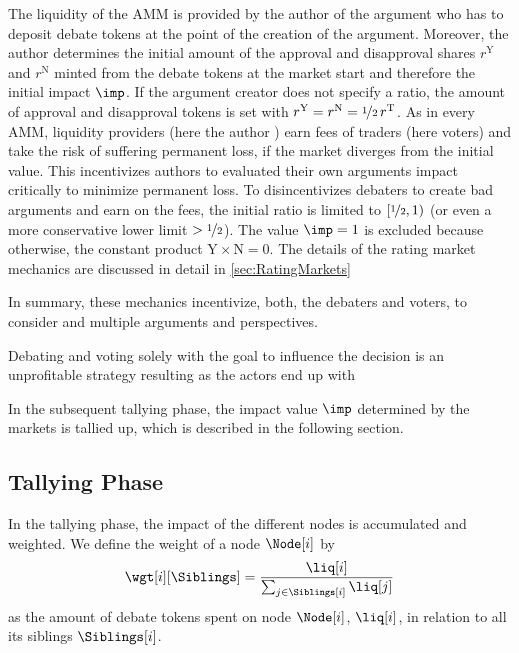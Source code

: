 \documentclass[%
aip,
amsmath,amssymb,
reprint,%
unsortedaddress,
nofootinbib
]{revtex4-2}
\newcommand{\sib}{\text{siblings}}
\newcommand{\T}{\text{T}}
\newcommand{\Y}{\text{Y}}
\newcommand{\N}{\text{N}}
\begin{document}
The liquidity of the \ac{AMM} is provided by the author of the argument who has to deposit debate tokens at the point of the creation of the argument.
Moreover, the author determines the initial amount of the approval and disapproval shares $r^\Y$ and $r^\N$ minted from the debate tokens at the market start
and therefore the initial impact $\imp$.
If the argument creator does not specify a ratio, 
the amount of approval and disapproval tokens is set with $r^\Y=r^\N=\nicefrac{1}{2}\,r^\T$. 
As in every \ac{AMM}, liquidity providers (here the author )
earn fees of traders (here voters)
and 
take the risk of suffering permanent loss, if the market diverges from the initial value.
This incentivizes authors to evaluated their own arguments impact critically 
to minimize permanent loss. 
To disincentivizes debaters to create bad arguments and earn on the fees,
the initial ratio is limited to $[\nicefrac{1}{2},1)$ (or even a more conservative lower limit $>\nicefrac{1}{2}$).
The value $\imp=1$ is excluded because otherwise, the constant product $\Y\times \N = 0$.
The details of the rating market mechanics are discussed in detail in \cref{sec:RatingMarkets}

In summary, these mechanics incentivize, both, the debaters and voters, to consider and multiple arguments and perspectives.
 
Debating and voting solely with the goal to influence the decision is an unprofitable  strategy resulting
as the actors end up with 

In the subsequent tallying phase,
the impact value $\imp$ determined by the markets is tallied up,
which is described in the following section.


\subsection{Tallying Phase}\label{sec:TallyingPhase}
In the tallying phase, the impact of the different nodes is accumulated and weighted.
We define the weight of a node $\Node[i]$ by
\begin{equation}
	\wgt[i][\Siblings] = \frac{\liq[i]}{\sum_{j\in \Siblings[i]}\liq[j]}
\end{equation}
as the 
amount of debate tokens spent on node $\Node[i]$, $\liq[i]$,
in relation to all its siblings $\Siblings[i]$.
\end{document}
